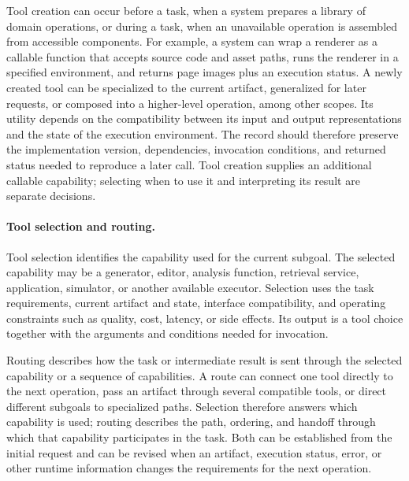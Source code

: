 Tool creation can occur before a task, when a system prepares a library of domain operations, or during a task, when an unavailable operation is assembled from accessible components. For example, a system can wrap a renderer as a callable function that accepts source code and asset paths, runs the renderer in a specified environment, and returns page images plus an execution status. A newly created tool can be specialized to the current artifact, generalized for later requests, or composed into a higher-level operation, among other scopes. Its utility depends on the compatibility between its input and output representations and the state of the execution environment. The record should therefore preserve the implementation version, dependencies, invocation conditions, and returned status needed to reproduce a later call. Tool creation supplies an additional callable capability; selecting when to use it and interpreting its result are separate decisions.

\paragraph{Tool selection and routing.}
Tool selection identifies the capability used for the current subgoal. The selected capability may be a generator, editor, analysis function, retrieval service, application, simulator, or another available executor. Selection uses the task requirements, current artifact and state, interface compatibility, and operating constraints such as quality, cost, latency, or side effects. Its output is a tool choice together with the arguments and conditions needed for invocation.

Routing describes how the task or intermediate result is sent through the selected capability or a sequence of capabilities. A route can connect one tool directly to the next operation, pass an artifact through several compatible tools, or direct different subgoals to specialized paths. Selection therefore answers which capability is used; routing describes the path, ordering, and handoff through which that capability participates in the task. Both can be established from the initial request and can be revised when an artifact, execution status, error, or other runtime information changes the requirements for the next operation. 

